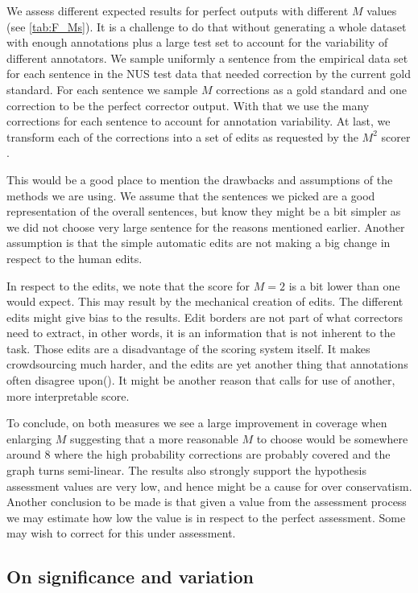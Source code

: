 \documentclass[english]{article}
\begin{document}
 We assess different expected results for perfect outputs with different $M$ values (see \ref{tab:F_Ms}).
 It is a challenge to do that without generating a whole dataset with enough annotations plus a large test
 set to account for the variability of different annotators. We sample uniformly a sentence from the
 empirical data set for each sentence in the NUS test data that needed correction by the current gold standard.
 For each sentence we sample $M$ corrections as a gold standard and one correction to be the perfect corrector
 output. With that we use the many corrections for each sentence to account for annotation variability.
 At last, we transform each of the corrections into a set of edits as requested
 by the $M^2$ scorer \cite{dahlmeier2012better}.  

This would be a good place to mention the drawbacks and assumptions of the methods we are using. We assume that the sentences we picked are a good representation of the overall sentences, but know they might be a bit simpler as we did not choose very large sentence for the reasons mentioned earlier. Another assumption is that the simple automatic edits are not making a big change in respect to the human edits.

In respect to the edits, we note that the score for $M=2$ is a bit lower than one would expect. This may result by the mechanical creation of edits. The different edits might give bias to the results. Edit borders are not part of what correctors need to extract, in other words, it is an information that is not inherent to the task. Those edits are a disadvantage of the scoring system itself. It makes crowdsourcing much harder, and the edits are yet another thing that annotations often disagree upon(\cite{dahlmeier2012better}). It might be another reason that calls for use of another, more interpretable score.

To conclude, on both measures we see a large improvement in coverage when enlarging $M$ suggesting that a more reasonable $M$ to choose would be somewhere around 8 where the high probability corrections are probably covered and the graph turns semi-linear. The results also strongly support the hypothesis assessment values are very low, and hence might be a cause for over conservatism.
 Another conclusion to be made is that given a value from the assessment process we may estimate how low the value is in respect to the perfect assessment. Some may wish to correct for this under assessment.

\subsection{On significance and variation}
\end{document}
